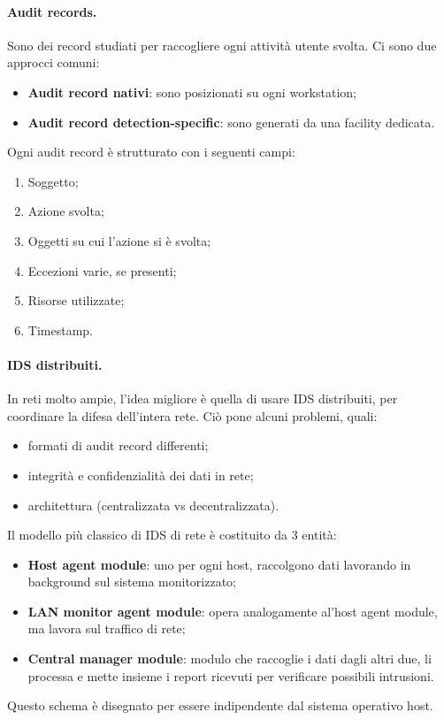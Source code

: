 \documentclass[a4paper, 10pt, twoside]{article}
\begin{document}
	\paragraph{Audit records.} Sono dei record studiati per raccogliere ogni attività utente svolta.
	Ci sono due approcci comuni: \begin{itemize}
		\item \textbf{Audit record nativi}: sono posizionati su ogni workstation;
		\item \textbf{Audit record detection-specific}: sono generati da una facility dedicata.
	\end{itemize}

	Ogni audit record è strutturato con i seguenti campi:\begin{enumerate}
		\item Soggetto;
		\item Azione svolta;
		\item Oggetti su cui l'azione si è svolta;
		\item Eccezioni varie, se presenti;
		\item Risorse utilizzate;
		\item Timestamp.
	\end{enumerate}

	

	\paragraph{IDS distribuiti.} In reti molto ampie, l'idea migliore è quella di usare IDS distribuiti, per coordinare la difesa dell'intera rete. Ciò pone alcuni problemi, quali: \begin{itemize}
		\item formati di audit record differenti;
		\item integrità e confidenzialità dei dati in rete;
		\item architettura (centralizzata vs decentralizzata).
	\end{itemize}

	Il modello più classico di IDS di rete è costituito da 3 entità:\begin{itemize}
		\item \textbf{Host agent module}: uno per ogni host, raccolgono dati lavorando in background sul sistema monitorizzato;
		\item \textbf{LAN monitor agent module}: opera analogamente al'host agent module, ma lavora sul traffico di rete;
		\item \textbf{Central manager module}: modulo che raccoglie i dati dagli altri due, li processa e mette insieme i report ricevuti per verificare possibili intrusioni.
	\end{itemize}
	Questo schema è disegnato per essere indipendente dal sistema operativo host.
\end{document}
